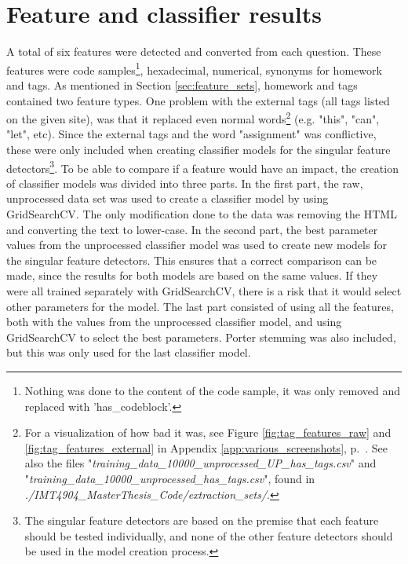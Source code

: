 \section{Feature and classifier results}
\label{sec:feature_classifier_results}
A total of six features were detected and converted from each question. 
These features were code samples\footnote{
	Nothing was done to the content of the code sample, it was only removed and replaced with 'has\_codeblock'.
}, 
hexadecimal, numerical, synonyms for homework and tags. 
As mentioned in Section \ref{sec:feature_sets}, homework and tags contained two feature types. 
One problem with the external tags (all tags listed on the given site), was that it replaced even normal words\footnote{
	For a visualization of how bad it was, see Figure \ref{fig:tag_features_raw} and \ref{fig:tag_features_external} in Appendix \ref{app:various_screenshots}, p.~\pageref{app:various_screenshots}.
	See also the files "\emph{training\_data\_10000\_unprocessed\_UP\_has\_tags.csv}" and "\emph{training\_data\_10000\_unprocessed\_has\_tags.csv}", found in \\ 
	\emph{./IMT4904\_MasterThesis\_Code/extraction\_sets/}.
} (e.g. "this", "can", "let", etc).
Since the external tags and the word "assignment" was conflictive, these were only included when creating classifier models for the singular feature detectors\footnote{
	The singular feature detectors are based on the premise that each feature should be tested individually, and none of the other feature detectors should be used in the model creation process.
}.
\vspace{0.5em}\newline
To be able to compare if a feature would have an impact, the creation of classifier models was divided into three parts. 
In the first part, the raw, unprocessed data set was used to create a classifier model by using GridSearchCV. 
The only modification done to the data was removing the HTML and converting the text to lower-case. 
In the second part, the best parameter values from the unprocessed classifier model was used to create new models for the singular feature detectors.
This ensures that a correct comparison can be made, since the results for both models are based on the same values. 
If they were all trained separately with GridSearchCV, there is a risk that it would select other parameters for the model.
The last part consisted of using all the features, both with the values from the unprocessed classifier model, and using GridSearchCV to select the best parameters.
Porter stemming was also included, but this was only used for the last classifier model.
